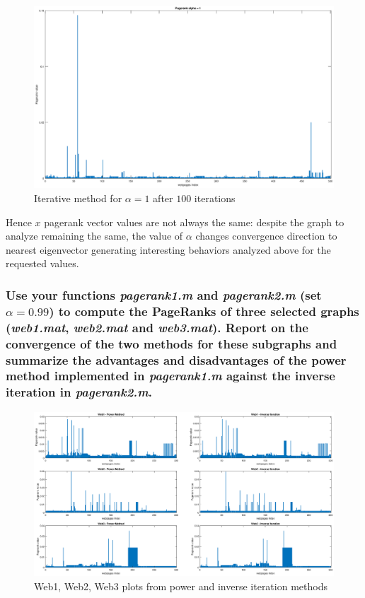 \documentclass[unicode,11pt,a4paper,oneside,numbers=endperiod,openany]{scrartcl}
\begin{document}
\begin{itemize}
          \begin{figure}[H]
              \centering
              \includegraphics[width=1\textwidth, trim={0 0 0 0}]{figures/ex4p3_a1_maxit.eps}
              \caption{Iterative method for $\alpha = 1$ after $100$ iterations}
              \label{fig:e4p3_a1_maxit}
          \end{figure}

          Hence $x$ pagerank vector values are not always the same: despite the graph to analyze remaining the same,
          the value of $\alpha$ changes convergence direction to nearest eigenvector generating interesting behaviors
          analyzed above for the requested values.

\end{itemize}

\subsubsection{Use your functions \textit{pagerank1.m} and \textit{pagerank2.m} (set $\alpha = 0.99$) to compute the PageRanks of three selected graphs (\textit{web1.mat}, \textit{web2.mat} and \textit{web3.mat}).
    Report on the convergence of the two methods for these subgraphs and summarize the advantages and disadvantages
    of the power method implemented in \textit{pagerank1.m} against the inverse iteration in \textit{pagerank2.m}.}

\begin{figure}[H]
    \centering
    \includegraphics[width=1.2\textwidth, trim={7cm 0 0 0}]{figures/ex4p4_plot.eps}
    \caption{Web1, Web2, Web3 plots from power and inverse iteration methods}
    \label{fig:e4p4_plot}
\end{figure}
\end{document}
